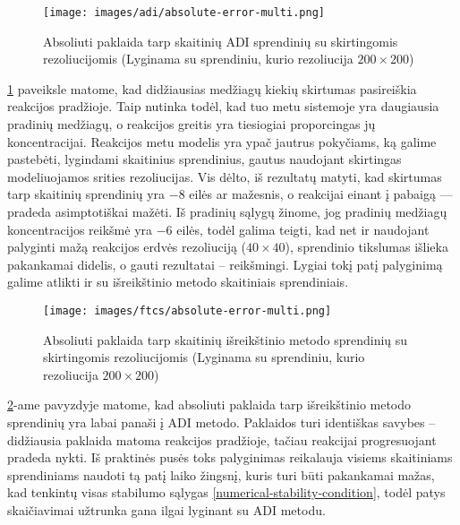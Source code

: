 \newpage

\begin{figure}[h!]
  \centering
  \texttt{[image: images/adi/absolute-error-multi.png]}
  \caption{Absoliuti paklaida tarp skaitinių ADI sprendinių su skirtingomis rezoliucijomis (Lyginama su sprendiniu, kurio rezoliucija $200\times200$)}
  \label{fig:adi-numerical-solution-absolute-error}
\end{figure}
\ref{fig:adi-numerical-solution-absolute-error} paveiksle matome, kad didžiausias medžiagų kiekių skirtumas pasireiškia reakcijos pradžioje. Taip nutinka todėl, kad tuo metu sistemoje yra daugiausia pradinių medžiagų, o reakcijos greitis yra tiesiogiai proporcingas jų koncentracijai. Reakcijos metu modelis yra ypač jautrus pokyčiams, ką galime pastebėti, lygindami skaitinius sprendinius, gautus naudojant skirtingas modeliuojamos srities rezoliucijas. Vis dėlto, iš rezultatų matyti, kad skirtumas tarp skaitinių sprendinių yra $-8$ eilės ar mažesnis, o reakcijai einant į pabaigą — pradeda asimptotiškai mažėti. Iš pradinių sąlygų žinome, jog pradinių medžiagų koncentracijos reikšmė yra $-6$ eilės, todėl galima teigti, kad net ir naudojant palyginti mažą reakcijos erdvės rezoliuciją ($40\times40$), sprendinio tikslumas išlieka pakankamai didelis, o gauti rezultatai -- reikšmingi. Lygiai tokį patį palyginimą galime atlikti ir su išreikštinio metodo skaitiniais sprendiniais.
\begin{figure}[ht!]
  \centering
  \texttt{[image: images/ftcs/absolute-error-multi.png]}
  \caption{Absoliuti paklaida tarp skaitinių išreikštinio metodo sprendinių su skirtingomis rezoliucijomis (Lyginama su sprendiniu, kurio rezoliucija $200\times200$)}
  \label{fig:ftcs-numerical-solution-absolute-error}
\end{figure}
\ref{fig:ftcs-numerical-solution-absolute-error}-ame pavyzdyje matome, kad absoliuti paklaida tarp išreikštinio metodo sprendinių yra labai panaši į ADI metodo. Paklaidos turi identiškas savybes -- didžiausia paklaida matoma reakcijos pradžioje, tačiau reakcijai progresuojant pradeda nykti. Iš praktinės pusės toks palyginimas reikalauja visiems skaitiniams sprendiniams naudoti tą patį laiko žingsnį, kuris turi būti pakankamai mažas, kad tenkintų visas stabilumo sąlygas \eqref{numerical-stability-condition}, todėl patys skaičiavimai užtrunka gana ilgai lyginant su ADI metodu.
